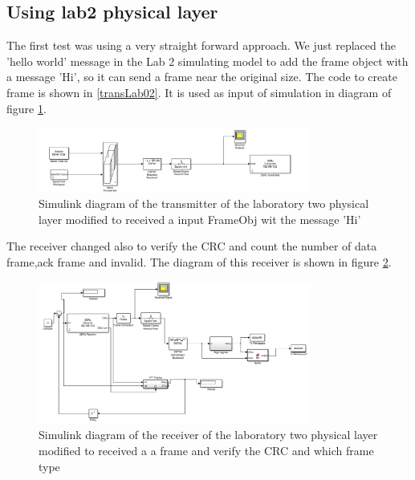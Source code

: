 \subsection{Using lab2 physical layer}

The first test was using a very straight forward approach. We just replaced the 'hello world' message in the Lab 2 
simulating model to add the frame object with a message 'Hi', so it can send a frame near the original size.
The code to create frame is shown in \ref{transLab02}. It is used as input of simulation in diagram of figure \ref{fig:trasmitter_lab02}.


\begin{figure}[ht]
    \centering
    \includegraphics[width=0.8\textwidth]{trasmitter_lab02.PNG}
    \caption{Simulink diagram of the transmitter of the laboratory two physical layer modified to received a input FrameObj wit the message 'Hi' }
    \label{fig:trasmitter_lab02}
\end{figure}

The receiver changed also to verify the CRC and count the number of data frame,ack frame and invalid. The diagram of this receiver is
shown in figure \ref{fig:receiver_lab02}.

\begin{figure}[ht]
    \centering
    \includegraphics[width=0.8\textwidth]{receiver_lab02.PNG}
    \caption{Simulink diagram of the receiver of the laboratory two physical layer modified to received a a frame and verify the CRC and which frame type }
    \label{fig:receiver_lab02}
\end{figure}



